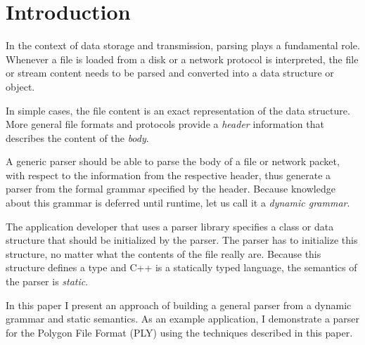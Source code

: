 \section{Introduction}

In the context of data storage and transmission, parsing plays a fundamental
role. Whenever a file is loaded from a disk or a network protocol is
interpreted, the file or stream content needs to be parsed and converted into a
data structure or object.

In simple cases, the file content is an exact representation of the data
structure. More general file formats and protocols provide a \emph{header}
information that describes the content of the \emph{body}.

A generic parser should be able to parse the body of a file or network packet,
with respect to the information from the respective header, thus generate a
parser from the formal grammar specified by the header. Because knowledge about
this grammar is deferred until runtime, let us call it a \emph{dynamic grammar}.

The application developer that uses a parser library specifies a class or data
structure that should be initialized by the parser. The parser has to initialize
this structure, no matter what the contents of the file really are. Because this
structure defines a type and C++ is a statically typed language, the semantics
of the parser is \emph{static}.

In this paper I present an approach of building a general parser from a dynamic
grammar and static semantics. As an example application, I demonstrate a parser
for the Polygon File Format (PLY) using the techniques described in this paper.

